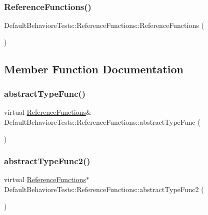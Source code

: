 \subsubsection{\texorpdfstring{ReferenceFunctions()}{ReferenceFunctions()}}
{\footnotesize\ttfamily Default\+Behaviore\+Tests\+::\+Reference\+Functions\+::\+Reference\+Functions (\begin{DoxyParamCaption}{ }\end{DoxyParamCaption})\hspace{0.3cm}{\ttfamily [default]}}



\subsection{Member Function Documentation}
\mbox{\label{structDefaultBehavioreTests_1_1ReferenceFunctions_a6266d3f96330937bb352e90f60e688f6}} 
\subsubsection{\texorpdfstring{abstractTypeFunc()}{abstractTypeFunc()}}
{\footnotesize\ttfamily virtual \mbox{\hyperlink{structDefaultBehavioreTests_1_1ReferenceFunctions}{Reference\+Functions}}\& Default\+Behaviore\+Tests\+::\+Reference\+Functions\+::abstract\+Type\+Func (\begin{DoxyParamCaption}{ }\end{DoxyParamCaption})\hspace{0.3cm}{\ttfamily [pure virtual]}}

\mbox{\label{structDefaultBehavioreTests_1_1ReferenceFunctions_a86e3c449407ce046dde1b4a2fa684f38}} 
\subsubsection{\texorpdfstring{abstractTypeFunc2()}{abstractTypeFunc2()}}
{\footnotesize\ttfamily virtual \mbox{\hyperlink{structDefaultBehavioreTests_1_1ReferenceFunctions}{Reference\+Functions}}$\ast$ Default\+Behaviore\+Tests\+::\+Reference\+Functions\+::abstract\+Type\+Func2 (\begin{DoxyParamCaption}{ }\end{DoxyParamCaption})\hspace{0.3cm}{\ttfamily [pure virtual]}}

